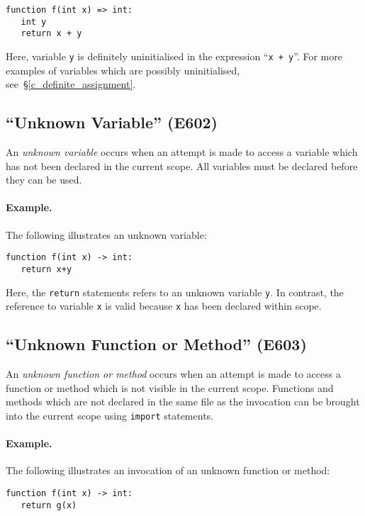 \begin{lstlisting}
function f(int x) => int:
   int y
   return x + y
\end{lstlisting}

Here, variable \lstinline{y} is definitely uninitialised in the expression ``\lstinline{x + y}''.  For more examples of variables which are possibly uninitialised, see~\S\ref{c_definite_assignment}.

\subsection{``Unknown Variable'' (E602)}

An {\em unknown variable} occurs when an attempt is made to access a variable which has not been declared in the current scope.  All variables must be declared before they can be used.

\paragraph{Example.}  The following illustrates an unknown variable:

\begin{lstlisting}
function f(int x) -> int:
   return x+y
\end{lstlisting}

Here, the \lstinline{return} statements refers to an unknown variable \lstinline{y}.  In contrast, the reference to variable \lstinline{x} is valid because \lstinline{x} has been declared within scope.

\subsection{``Unknown Function or Method'' (E603)}

An {\em unknown function or method} occurs when an attempt is made to access a function or method which is not visible in the current scope.  Functions and methods which are not declared in the same file as the invocation can be brought into the current scope using \lstinline{import} statements.  
\paragraph{Example.}  The following illustrates an invocation of an unknown function or method:

\begin{lstlisting}
function f(int x) -> int:
   return g(x)
\end{lstlisting}

